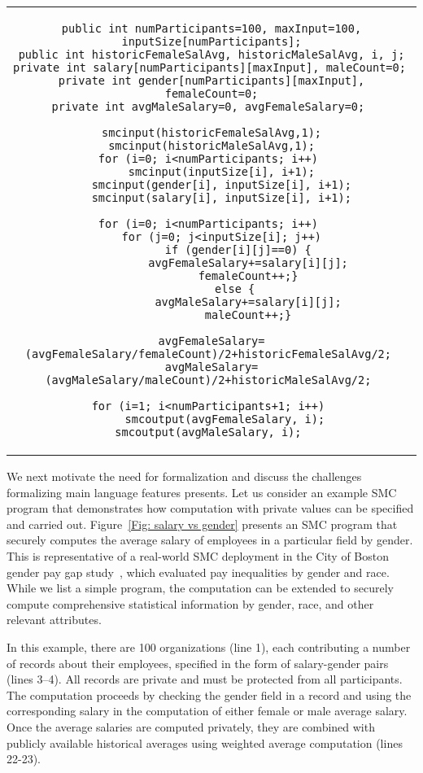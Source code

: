 


\begin{figure*} \centering
\begin{tabular}{c}
\begin{lstlisting}
public int numParticipants=100, maxInput=100, inputSize[numParticipants];
public int historicFemaleSalAvg, historicMaleSalAvg, i, j;
private int salary[numParticipants][maxInput], maleCount=0; 
private int gender[numParticipants][maxInput], femaleCount=0;
private int avgMaleSalary=0, avgFemaleSalary=0; 

smcinput(historicFemaleSalAvg,1); smcinput(historicMaleSalAvg,1);
for (i=0; i<numParticipants; i++) 
	smcinput(inputSize[i], i+1); 
	smcinput(gender[i], inputSize[i], i+1); 
	smcinput(salary[i], inputSize[i], i+1); 
	
for (i=0; i<numParticipants; i++) 
	for (j=0; j<inputSize[i]; j++) 
		if (gender[i][j]==0) {
			avgFemaleSalary+=salary[i][j]; 
			femaleCount++;} 
		else { 
			avgMaleSalary+=salary[i][j]; 
			maleCount++;} 
			
avgFemaleSalary=(avgFemaleSalary/femaleCount)/2+historicFemaleSalAvg/2; 
avgMaleSalary=(avgMaleSalary/maleCount)/2+historicMaleSalAvg/2; 

for (i=1; i<numParticipants+1; i++) 
	smcoutput(avgFemaleSalary, i);  smcoutput(avgMaleSalary, i); 
\end{lstlisting}
\end{tabular}
\caption{Securely calculating the gender pay gap for 100 organizations.}
\label{Fig: salary vs gender}
\end{figure*}


We next motivate the need for formalization and discuss the challenges formalizing main language features presents. Let us consider an example SMC program that demonstrates how computation with private values can be specified and carried out. Figure~\ref{Fig: salary vs gender} presents an SMC program that securely computes the average salary of employees in a particular field by gender. This is representative of a real-world SMC deployment in the City of Boston gender pay gap study~\cite{Lapets18}, which evaluated pay inequalities by gender and race. While we list a simple program, the computation can be extended to securely compute comprehensive statistical information by gender, race, and other relevant attributes.

In this example, there are 100 organizations (line 1), each contributing a number of records about their employees, specified in the form of salary-gender pairs (lines 3--4). All records are private and must be protected from all participants. The computation proceeds by checking the gender field in a record and using the corresponding salary in the computation of either female or male average salary. Once the average salaries are computed privately, they are combined with publicly available historical averages using weighted average computation (lines 22-23).

